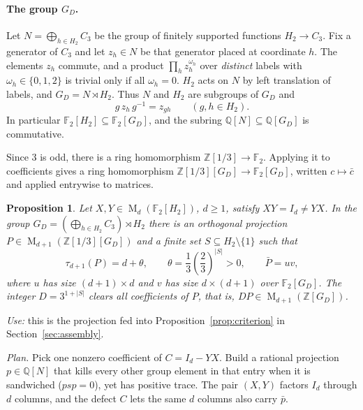 \documentclass[11pt]{article}
\newtheorem{proposition}[theorem]{Proposition}
\theoremstyle{remark}
\numberwithin{equation}{section}
\newcommand{\F}{\mathbb F}
\newcommand{\Z}{\mathbb Z}
\newcommand{\Q}{\mathbb Q}
\newcommand{\Mat}{\operatorname{M}}
\begin{document}
\paragraph{The group $G_D$.} Let $N=\bigoplus_{h\in H_2}C_3$ be the group of finitely supported functions $H_2\to C_3$. Fix a generator of $C_3$ and let $z_h\in N$ be that generator placed at coordinate $h$. The elements $z_h$ commute, and a product $\prod_hz_h^{\omega_h}$ over \emph{distinct} labels with $\omega_h\in\{0,1,2\}$ is trivial only if all $\omega_h=0$. $H_2$ acts on $N$ by left translation of labels, and $G_D=N\rtimes H_2$. Thus $N$ and $H_2$ are subgroups of $G_D$ and
\begin{equation}\label{eq:conj}
 g\,z_h\,g^{-1}=z_{gh}\qquad(g,h\in H_2).
\end{equation}
In particular $\F_2[H_2]\subseteq\F_2[G_D]$, and the subring $\Q[N]\subseteq\Q[G_D]$ is commutative.

Since $3$ is odd, there is a ring homomorphism $\Z[1/3]\to\F_2$. Applying it to coefficients gives a ring homomorphism $\Z[1/3][G_D]\to\F_2[G_D]$, written $c\mapsto\bar c$ and applied entrywise to matrices.

\begin{proposition}\label{prop:separation}
Let $X,Y\in\Mat_d(\F_2[H_2])$, $d\ge1$, satisfy
$XY=I_d\ne YX$. In the group
$G_D=(\bigoplus_{h\in H_2}C_3)\rtimes H_2$ there is an orthogonal
projection $P\in\Mat_{d+1}(\Z[1/3][G_D])$ and a finite set
$S\subseteq H_2\setminus\{1\}$ such that
\[
 \tau_{d+1}(P)=d+\theta,\qquad
 \theta=\frac13\left(\frac23\right)^{|S|}>0,
 \qquad \bar P=uv,
\]
where $u$ has size $(d+1)\times d$ and $v$ has size $d\times(d+1)$
over $\F_2[G_D]$. The integer $D=3^{1+|S|}$ clears all coefficients
of $P$, that is, $DP\in\Mat_{d+1}(\Z[G_D])$.
\end{proposition}

\emph{Use:} this is the projection fed into Proposition~\ref{prop:criterion} in Section~\ref{sec:assembly}.

\emph{Plan.} Pick one nonzero coefficient of $C=I_d-YX$. Build a rational projection $p\in\Q[N]$ that kills every other group element in that entry when it is sandwiched ($psp=0$), yet has positive trace. The pair $(X,Y)$ factors $I_d$ through $d$ columns, and the defect $C$ lets the same $d$ columns also carry $\bar p$.
\end{document}
